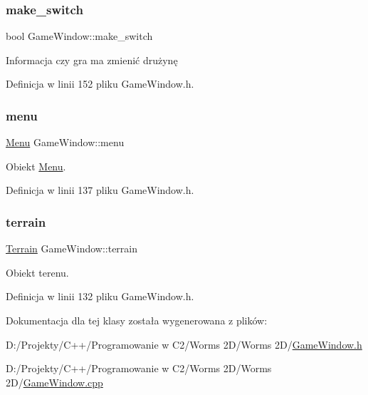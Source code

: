 \subsubsection{\texorpdfstring{make\+\_\+switch}{make\_switch}}
{\footnotesize\ttfamily bool Game\+Window\+::make\+\_\+switch}



Informacja czy gra ma zmienić drużynę 



Definicja w linii 152 pliku Game\+Window.\+h.

\mbox{\label{class_game_window_a3c63dc36f53ecb9b1d055923293daffd}} 
\subsubsection{\texorpdfstring{menu}{menu}}
{\footnotesize\ttfamily \mbox{\hyperlink{class_menu}{Menu}} Game\+Window\+::menu}



Obiekt \mbox{\hyperlink{class_menu}{Menu}}. 



Definicja w linii 137 pliku Game\+Window.\+h.

\mbox{\label{class_game_window_ab5d02e9738d1f7f3fea4cd146172cf11}} 
\subsubsection{\texorpdfstring{terrain}{terrain}}
{\footnotesize\ttfamily \mbox{\hyperlink{class_terrain}{Terrain}} Game\+Window\+::terrain}



Obiekt terenu. 



Definicja w linii 132 pliku Game\+Window.\+h.



Dokumentacja dla tej klasy została wygenerowana z plików\+:\begin{DoxyCompactItemize}
\item 
D\+:/\+Projekty/\+C++/\+Programowanie w C2/\+Worms 2\+D/\+Worms 2\+D/\mbox{\hyperlink{_game_window_8h}{Game\+Window.\+h}}\item 
D\+:/\+Projekty/\+C++/\+Programowanie w C2/\+Worms 2\+D/\+Worms 2\+D/\mbox{\hyperlink{_game_window_8cpp}{Game\+Window.\+cpp}}\end{DoxyCompactItemize}
